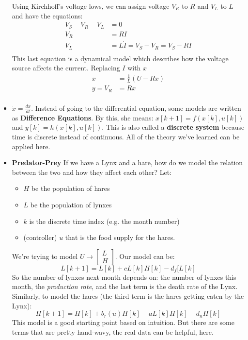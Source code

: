 \documentclass[12pt]{article}
\theoremstyle{definition}
\begin{document}
\begin{itemize}
    Using Kirchhoff's voltage lows, we can assign voltage $V_R$ to $R$ and $V_L$ to $L$ and have the equations:
    \begin{align*}
        V_S - V_R - V_L &= 0 \\
        V_R &= R I \\
        V_L &= L \dot{I}  = V_S - V_R = V_S - RI\\
    \end{align*}
    This last equation is a dynamical model which describes how the voltage source affects the current. Replacing $I$ with $x$
    \begin{align*}
        \dot{x} &= \frac{1}{L}(U - Rx) \\
        y = V_R &= Rx \\
    \end{align*}
    \item $\dot{x} = \frac{dx}{dt}$. Instead of going to the differential equation, some models are written as \textbf{Difference Equations}. By this, she means: $x[k + 1] = f(x[k], u[k])$ and $y[k] = h(x[k], u[k])$. This is also called a \textbf{discrete system} because time is discrete instead of continuous. All of the theory we've learned can be applied here. 
    \item \textbf{Predator-Prey} If we have a Lynx and a hare, how do we model the relation between the two and how they affect each other? Let:
    \begin{itemize}
        \itemsep0em 
        \item $H$ be the population of hares
        \item $L$ be the population of lynxes
        \item $k$ is the discrete time index (e.g. the month number)
        \item (controller) $u$ that is the food supply for the hares.
    \end{itemize}
    We're trying to model $U \rightarrow \begin{bmatrix} L \\ H \end{bmatrix}$. Our model can be:
    $$L[k + 1] = L[k] + cL[k]H[k] - d_f[L[k]$$
    So the number of lynxes next month depends on: the number of lynxes this month, the \textit{production rate}, and the last term is the death rate of the Lynx. Similarly, to model the hares (the third term is the hares getting eaten by the Lynx):
    $$H[k + 1] = H[k] + b_r(u)H[k] - aL[k]H[k] - d_nH[k]$$
    This model is a good starting point based on intuition. But there are some terms that are pretty hand-wavy, the real data can be helpful, here. 

\end{itemize}
\end{document}
